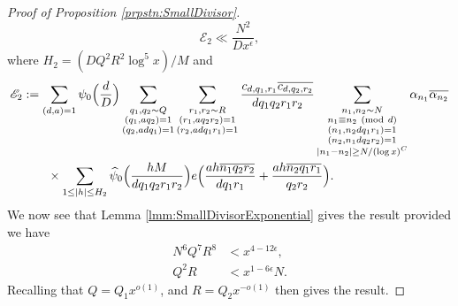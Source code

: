 \documentclass[10pt]{amsart}
\theoremstyle{plain}
\numberwithin{equation}{section}
\newcommand{\Mod}[1]{\ (\mathrm{mod}\ #1)}
\renewcommand{\hat}[1]{\widehat #1}
\begin{document}
\begin{proof}[Proof of Proposition \ref{prpstn:SmallDivisor}]
\[
\mathscr{E}_2\ll \frac{N^2}{D x^\epsilon},
\]
where $H_2=(D Q^2 R^2\log^5{x})/M$ and
\begin{align*}
\mathscr{E}_2&:=\sum_{\substack{(d,a)=1}}\psi_0\Bigl(\frac{d}{D}\Bigr)\sum_{\substack{q_1,q_2\sim Q \\ (q_1,aq_2)=1\\ (q_2,a d q_1)=1}}\sum_{\substack{r_1,r_2\sim R\\ (r_1,aq_2 r_2)=1\\ (r_2,a d q_1 r_1)=1}}\frac{c_{d,q_1,r_1}\overline{c_{d,q_2,r_2}}}{d q_1 q_2 r_1 r_2}\sum_{\substack{n_1,n_2\sim N\\ n_1\equiv n_2\Mod{d}\\ (n_1,n_2 d q_1 r_1)=1\\(n_2,n_1 d q_2 r_2)=1\\ |n_1-n_2|\ge N/(\log{x})^C}}\alpha_{n_1}\overline{\alpha_{n_2}}\\
&\qquad\times\sum_{1\le |h|\le H_2}\hat{\psi}_0\Bigl(\frac{h M}{d q_1 q_2 r_1 r_2}\Bigr)e\Bigl(\frac{ah\overline{n_1 q_2 r_2}}{d q_1 r_1}+\frac{ah\overline{n_2 q_1 r_1}}{q_2 r_2}\Bigr).
\end{align*}
We now see that Lemma \ref{lmm:SmallDivisorExponential} gives the result provided we have
\begin{align*}
N^6 Q^{7} R^8&<x^{4-12\epsilon},\\
Q^2 R&<x^{1-6\epsilon} N.
\end{align*}
Recalling that $Q=Q_1x^{o(1)}$, and $R=Q_2x^{-o(1)}$ then gives the result.
\end{proof}
%
%
%
%
%
%
%
%
%
%
%
%
%
%
%
%
%
%
\end{document}
